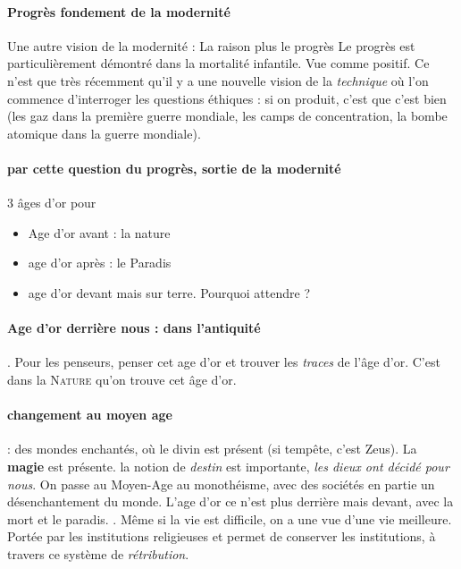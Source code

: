\paragraph{Progrès fondement de la modernité}Une autre vision de la modernité : La raison plus le progrès 
Le progrès est particulièrement démontré dans la mortalité infantile. Vue comme positif.
Ce n'est que très récemment qu'il y a une nouvelle vision de la \textit{technique} où l'on commence d'interroger les questions éthiques : si on produit, c'est que c'est bien (les gaz dans la première guerre mondiale, les camps de concentration, la bombe atomique dans la guerre mondiale).

\paragraph{par cette question du progrès, sortie de la modernité}


3 âges d'or pour 
\begin{itemize}
\item Age d'or avant : la nature
\item age d'or après : le Paradis
\item age d'or devant mais sur terre. Pourquoi attendre ?
\end{itemize}
\paragraph{ Age d'or derrière nous : dans l'antiquité}. Pour les penseurs, penser cet age d'or et trouver les \textit{traces} de l'âge d'or. C'est dans la \textsc{Nature} qu'on trouve cet âge d'or. 
\paragraph{changement au moyen age}   : des mondes enchantés, où le divin est présent (si tempête, c'est Zeus). La \textbf{magie} est présente. la notion de \textit{destin} est importante, \textit{les dieux ont décidé pour nous}. On passe au Moyen-Age au monothéisme, avec des sociétés en partie un désenchantement du monde. L'age d'or ce n'est plus derrière mais devant, avec la mort et le paradis. . Même si la vie est difficile, on a une vue d'une vie meilleure. 
    Portée par les institutions religieuses et permet de conserver les institutions, à travers ce système de \textit{rétribution}. 
